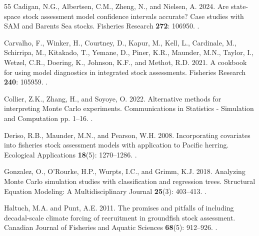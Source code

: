 \documentclass[
  12pt,
]{article}
\begin{document}
\begin{thebibliography}{55}
Cadigan, N.G., Albertsen, C.M., Zheng, N., and Nielsen, A. 2024.
\newblock Are state-space stock assessment model confidence intervals accurate? {C}ase studies with {SAM} and {B}arents {S}ea stocks.
\newblock Fisheries Research \textbf{272}: 106950.
\newblock {}.

Carvalho, F., Winker, H., Courtney, D., Kapur, M., Kell, L., Cardinale, M., Schirripa, M., Kitakado, T., Yemane, D., Piner, K.R., Maunder, M.N., Taylor, I., Wetzel, C.R., Doering, K., Johnson, K.F., and Methot, R.D. 2021.
\newblock A cookbook for using model diagnostics in integrated stock assessments.
\newblock Fisheries Research \textbf{240}: 105959.
\newblock {}.

Collier, Z.K., Zhang, H., and Soyoye, O. 2022.
\newblock Alternative methods for interpreting {M}onte {C}arlo experiments.
\newblock Communications in Statistics - Simulation and Computation pp. 1--16.
\newblock {}.

Deriso, R.B., Maunder, M.N., and Pearson, W.H. 2008.
\newblock Incorporating covariates into fisheries stock assessment models with application to {P}acific herring.
\newblock Ecological Applications \textbf{18}(5): 1270--1286.
\newblock {}.

Gonzalez, O., O’Rourke, H.P., Wurpts, I.C., and Grimm, K.J. 2018.
\newblock Analyzing {M}onte {C}arlo simulation studies with classification and regression trees.
\newblock Structural Equation Modeling: A Multidisciplinary Journal \textbf{25}(3): 403--413.
\newblock {}.

Haltuch, M.A. and Punt, A.E. 2011.
\newblock The promises and pitfalls of including decadal-scale climate forcing of recruitment in groundfish stock assessment.
\newblock Canadian Journal of Fisheries and Aquatic Sciences \textbf{68}(5): 912--926.
\newblock {}.


\end{thebibliography}
\end{document}
